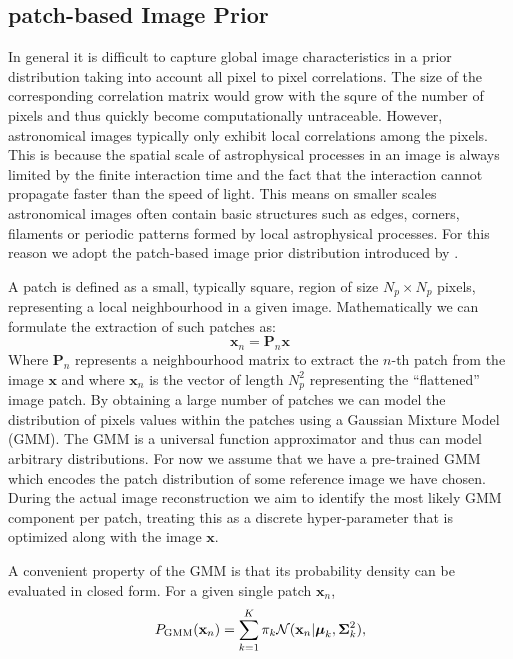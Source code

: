 \documentclass[twocolumn]{aastex631}
\begin{document}
    \subsection{patch-based Image Prior}
    \label{sec:patch-prior}
    In general it is difficult to capture global image characteristics in a prior distribution taking into account all pixel to pixel correlations. The size of the corresponding correlation matrix would grow with the squre of the number of pixels  and thus quickly become computationally untraceable. However, astronomical images typically only exhibit local correlations among the pixels. This is because the spatial scale of astrophysical processes in an image is always limited by the finite interaction time and the fact that the interaction cannot propagate faster than the speed of light. This means on smaller scales astronomical images often contain basic structures such as edges, corners, filaments or periodic patterns formed by local astrophysical processes. For this reason we adopt the patch-based image prior distribution introduced by \cite{Zoran2011}. 

    A patch is defined as a small, typically square, region of size $N_p \times N_p$ pixels, representing a local neighbourhood in a given image. Mathematically we can formulate the extraction of such patches as:
    \begin{equation}
        \mathbf{x}_n = \mathbf{P}_n \mathbf{x}
    \end{equation}
    Where $\mathbf{P}_n$ represents a neighbourhood matrix to extract the $n$-th patch from the image $\mathbf{x}$ and where $\mathbf{x}_n$ is the vector of length $N_p^2$ representing the \enquote{flattened} image patch. By obtaining a large number of patches we can model the distribution of pixels values within the patches using a Gaussian Mixture Model (GMM). The GMM is a universal function approximator and thus can model arbitrary distributions. For now we assume that we have a pre-trained GMM which encodes the patch distribution of some reference image we have chosen. During the actual image reconstruction we aim to identify the most likely GMM component per patch, treating this as a discrete hyper-parameter
    that is optimized along with the image $\mathbf{x}$. 
    
    A convenient property of the GMM is that its probability density can be evaluated in closed form. For a given single patch $\mathbf{x}_n$,
    \begin{equation}
        \label{eq:gmm}
        P_{\rm GMM}(\mathbf{x}_n) = \sum_{k=1}^K \pi_k \mathcal{N}(\mathbf{x}_n| \boldsymbol{\mu}_k, \boldsymbol{\Sigma}_k^2),
    \end{equation}
\end{document}
